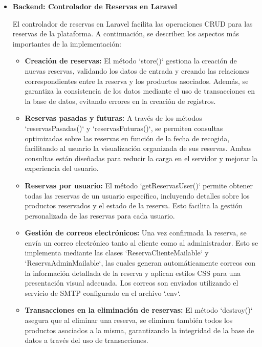 \begin{itemize} \item \textbf{Backend: Controlador de Reservas en Laravel}

    El controlador de reservas en Laravel facilita las operaciones CRUD para las reservas de la plataforma. A continuación, se describen los aspectos más importantes de la implementación:

\begin{itemize}
    \item \textbf{Creación de reservas: }El método `store()` gestiona la creación de nuevas reservas, validando los datos de entrada y creando las relaciones correspondientes entre la reserva y los productos asociados. Además, se garantiza la consistencia de los datos mediante el uso de transacciones en la base de datos, evitando errores en la creación de registros.

    \item \textbf{Reservas pasadas y futuras: }A través de los métodos `reservasPasadas()` y `reservasFuturas()`, se permiten consultas optimizadas sobre las reservas en función de la fecha de recogida, facilitando al usuario la visualización organizada de sus reservas. Ambas consultas están diseñadas para reducir la carga en el servidor y mejorar la experiencia del usuario.

    \item \textbf{Reservas por usuario: }El método `getReservasUser()` permite obtener todas las reservas de un usuario específico, incluyendo detalles sobre los productos reservados y el estado de la reserva. Esto facilita la gestión personalizada de las reservas para cada usuario.

    \item \textbf{Gestión de correos electrónicos: }Una vez confirmada la reserva, se envía un correo electrónico tanto al cliente como al administrador. Esto se implementa mediante las clases `ReservaClienteMailable` y `ReservaAdminMailable`, las cuales generan automáticamente correos con la información detallada de la reserva y aplican estilos CSS para una presentación visual adecuada. Los correos son enviados utilizando el servicio de SMTP configurado en el archivo `.env`.

    \item \textbf{Transacciones en la eliminación de reservas: }El método `destroy()` asegura que al eliminar una reserva, se eliminen también todos los productos asociados a la misma, garantizando la integridad de la base de datos a través del uso de transacciones.


\end{itemize}
\end{itemize}
